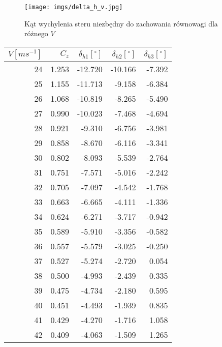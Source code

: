 \documentclass[12pt]{sprawozdanie}
\begin{document}
\begin{figure}[h!]
    \centering
    \texttt{[image: imgs/delta\_h\_v.jpg]}

    \caption{Kąt wychylenia steru niezbędny do zachowania równowagi dla różnego $V$}
    \label{fig:deltahv}
\end{figure}
\FloatBarrier

\begin{table}[h!]
    \centering
    \begin{tabular}{rrrrr}
        \toprule
        $V [ms^{-1}]$ &   $C_z$ &  $\delta_{h1}[^{\circ}]$ &  $\delta_{h2}[^{\circ}]$ &  $\delta_{h3}[^{\circ}]$ \\
        \midrule
        24  &  1.253 &   -12.720 &   -10.166 &    -7.392 \\
        25  &  1.155 &   -11.713 &    -9.158 &    -6.384 \\
        26  &  1.068 &   -10.819 &    -8.265 &    -5.490 \\
        27  &  0.990 &   -10.023 &    -7.468 &    -4.694 \\
        28  &  0.921 &    -9.310 &    -6.756 &    -3.981 \\
        29  &  0.858 &    -8.670 &    -6.116 &    -3.341 \\
        30  &  0.802 &    -8.093 &    -5.539 &    -2.764 \\
        31  &  0.751 &    -7.571 &    -5.016 &    -2.242 \\
        32  &  0.705 &    -7.097 &    -4.542 &    -1.768 \\
        33  &  0.663 &    -6.665 &    -4.111 &    -1.336 \\
        34  &  0.624 &    -6.271 &    -3.717 &    -0.942 \\
        35  &  0.589 &    -5.910 &    -3.356 &    -0.582 \\
        36  &  0.557 &    -5.579 &    -3.025 &    -0.250 \\
        37  &  0.527 &    -5.274 &    -2.720 &     0.054 \\
        38  &  0.500 &    -4.993 &    -2.439 &     0.335 \\
        39  &  0.475 &    -4.734 &    -2.180 &     0.595 \\
        40  &  0.451 &    -4.493 &    -1.939 &     0.835 \\
        41  &  0.429 &    -4.270 &    -1.716 &     1.058 \\
        42  &  0.409 &    -4.063 &    -1.509 &     1.265 \\

\end{tabular}
\end{table}
\end{document}

